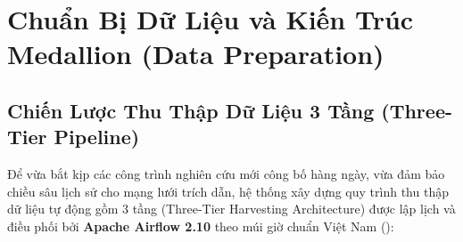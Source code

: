 
\chapter{Chuẩn Bị Dữ Liệu và Kiến Trúc Medallion (Data Preparation)}
\label{chap:data_preparation}

\section{Chiến Lược Thu Thập Dữ Liệu 3 Tầng (Three-Tier Pipeline)}

Để vừa bắt kịp các công trình nghiên cứu mới công bố hàng ngày, vừa đảm bảo chiều sâu lịch sử cho mạng lưới trích dẫn, hệ thống xây dựng quy trình thu thập dữ liệu tự động gồm 3 tầng (Three-Tier Harvesting Architecture) được lập lịch và điều phối bởi \textbf{Apache Airflow 2.10} theo múi giờ chuẩn Việt Nam ():

